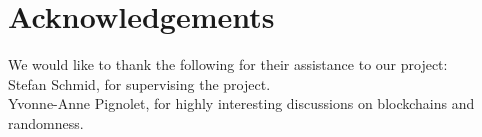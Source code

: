 \section{Acknowledgements}\label{sec:acknowledgements}
We would like to thank the following for their assistance to our project:\\
Stefan Schmid, for supervising the project. \\
Yvonne-Anne Pignolet, for highly interesting discussions on blockchains and randomness. \\
 